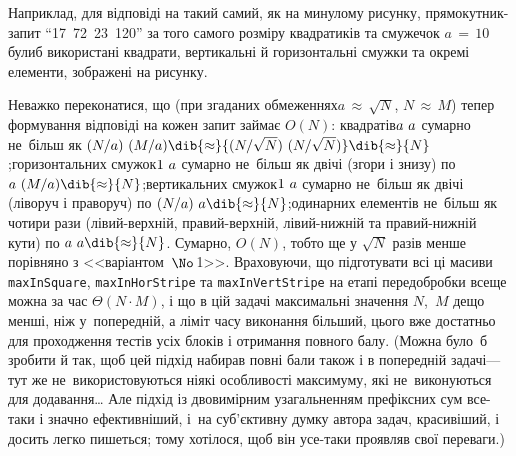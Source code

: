 Наприклад, для відповіді на такий самий, як на минулому рисунку, прямокутник-запит ``17~72~23~120'' за того самого розміру квадратиків та смужечок ${a\,{=}\,10}$ були\nolinebreak[3] б використані квадрати, вертикальні й горизонтальні смужки та окремі елементи, зображені на рисунку.

Неважко переконатися, що (при згаданих обмеженнях\nolinebreak[2] ${a\,{\approx}\,\sqrt{N}}$, \nolinebreak[2] ${N\,{\approx}\,M}$) тепер формування відповіді на кожен запит займає $O(N)$: 
квадратів\nolinebreak[2] ${a\,{\*}\,a}$ сумарно не~більш як ${(N/a)\,{\*}\,(M/a)}\dib{{\approx}}{(N/\sqrt{N})\,{\*}\,(N/\sqrt{N})}\dib{{\approx}}{N}$;\linebreak[2]
горизонтальних смужок\nolinebreak[2] ${1\,{\*}\,a}$ сумарно не~більш як двічі (згори і знизу) по ${a\,{\*}\,(M/a)}\dib{{\approx}}{N}$;\linebreak[2]
вертикальних смужок\nolinebreak[2] ${1\,{\*}\,a}$ сумарно не~більш як двічі (ліворуч і праворуч) по ${(N/a)\,{\*}\,a}\dib{{\approx}}{N}$;\linebreak[2]
одинарних елементів не~більш як чотири рази (лівий-верхній, правий-верхній, лівий-нижній та правий-нижній кути) по ${a\,{\*}\,a}\dib{{\approx}}{N}$.
Сумарно, $O(N)$, тобто ще у $\sqrt{N}$ разів менше порівняно з <<варіантом~$\No\,$1>>. Враховуючи, що підготувати всі ці масиви \texttt{maxInSquare}, \texttt{maxInHorStripe} та \texttt{maxInVertStripe} на етапі передобробки все\nolinebreak[3] ще можна за час $\Theta(N{\cdot}M)$, і що в цій задачі максимальні значення $N$,~$M$ дещо менші, ніж у~попередній, а ліміт часу виконання більший, цього вже достатньо для проходження тестів усіх блоків і отримання повного балу.
(Можна було~б зробити й так, щоб цей підхід набирав повні бали також і в попередній задачі\nolinebreak[3] --- тут же не~використовуються ніякі особливості максимуму, які не~виконуються для додавання\dots{} Але підхід із двовимірним узагальненням префіксних сум все-таки і значно ефективніший, і~на суб'єктивну думку автора задач, красивіший, і досить легко пишеться; тому хотілося, щоб він усе-таки проявляв свої переваги.)

